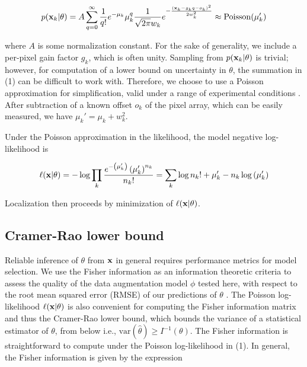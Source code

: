 \begin{equation}
p(\bold{x}_{k}\lvert\theta) = A\sum_{q=0}^{\infty} \frac{1}{q!}e^{-\mu_{k}}\mu_{k}^{q}\frac{1}{\sqrt{2\pi}w_{k}}e^{-\frac{(\bold{x}_{k}-g_{k}q-o_{k})^2}{2 w_{k}^{2}}} \approx \mathrm{Poisson}(\mu_{k}')
\end{equation}

where $A$ is some normalization constant. For the sake of generality, we include a per-pixel gain factor $g_{k}$, which is often unity. Sampling from $p(\bold{x}_{k}\lvert\theta)$ is trivial; however, for computation of a lower bound on uncertainty in $\theta$, the summation in (1) can be difficult to work with. Therefore, we choose to use a Poisson approximation for simplification, valid under a range of experimental conditions \parencite{Huang2013}. After subtraction of a known offset $o_{k}$ of the pixel array, which can be easily measured, we have $\mu_{k}' = \mu_{k} + w_{k}^{2}$.

Under the Poisson approximation in the likelihood, the model negative log-likelihood is

\begin{equation}
\ell(\bold{x}\lvert\theta) = -\log \prod_{k} \frac{e^{-\left(\mu_{k}'\right)}\left(\mu_{k}'\right)^{n_{k}}}{n_{k}!} = \sum_{k}  \log n_{k}! + \mu_{k}' - n_{k}\log\left(\mu_{k}'\right)
\end{equation}

Localization then proceeds by minimization of $\ell(\bold{x}\lvert\theta)$. 

\subsection{Cramer-Rao lower bound}

Reliable inference of $\theta$ from $\bold{x}$ in general requires performance metrics for model selection. We use the Fisher information as an information theoretic criteria to assess the quality of the data augmentation model $\phi$ tested here, with respect to the root mean squared error (RMSE) of our predictions of $\theta$ \parencite{Chao2016}. The Poisson log-likelihood $\ell(\bold{x}\lvert\theta)$ is also convenient for computing the Fisher information matrix \parencite{Smith2010} and thus the Cramer-Rao lower bound, which bounds the variance of a statistical estimator of $\theta$, from below i.e., $\mathrm{var}(\hat{\theta}) \geq I^{-1}(\theta)$. The Fisher information is straightforward to compute under the Poisson log-likelihood in (1). In general, the Fisher information is given by the expression

